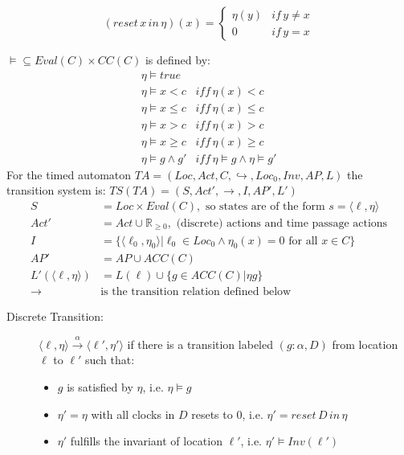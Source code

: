 \documentclass[a4paper, 10pt]{article}
\begin{document}
\begin{mdframed}
\begin{itemize}
    \[ (reset\, x\,in\, \eta)(x)=\begin{cases} \eta(y) & if\,y\not=x \\ 0 & if\,y=x \end{cases} \]
\end{itemize}
$\models\subseteq Eval(C)\times CC(C)$ is defined by:
\begin{align*}
\eta\models true \\
\eta\models x<c         & iff\,\eta(x) <c \\
\eta\models x\leq c     & iff\,\eta(x) \leq c \\
\eta\models x>c         & iff\,\eta(x) >c \\
\eta\models x\geq c     & iff\,\eta(x) \geq c \\
\eta\models g\wedge g'  & iff\,\eta\models g \wedge\eta\models g'
\end{align*}
For the timed automaton $TA=(Loc,Act,C,\hookrightarrow,Loc_0,Inv,AP,L)$ the transition system is: $TS(TA) = (S,Act',\to,I,AP',L')$
\begin{align*}
S &= Loc\times Eval(C), \text{ so states are of the form } s=\langle\ell,\eta\rangle \\
Act'&=Act\cup\mathds{R}_{\geq0},\text{ (discrete) actions and time passage actions} \\
I &= \{\langle\ell_0,\eta_0\rangle | \ell_0\in Loc_0 \wedge\eta_0(x)=0 \text{ for all } x\in C\} \\
AP' &= AP\cup ACC(C) \\
L' (\langle\ell,\eta\rangle) &= L(\ell)\cup\{g\in ACC(C)|\eta g\} \\
\to& \text{is the transition relation defined below}
\end{align*}
\begin{description}
    \item[Discrete Transition:] $\langle\ell,\eta\rangle\overset{\alpha}{\longrightarrow}\langle\ell',\eta'\rangle$ if there is a transition labeled $(g:\alpha,D)$ from location $\ell$ to $\ell'$ such that:
    \begin{itemize}
        \item $g$ is satisfied by $\eta$, i.e. $\eta\models g$
        \item $\eta'=\eta$ with all clocks in $D$ resets to $0$, i.e. $\eta'=reset\, D\,in\,\eta$
        \item $\eta'$ fulfills the invariant of location $\ell'$, i.e. $\eta'\models Inv(\ell')$

\end{itemize}
\end{description}
\end{mdframed}
\end{document}
